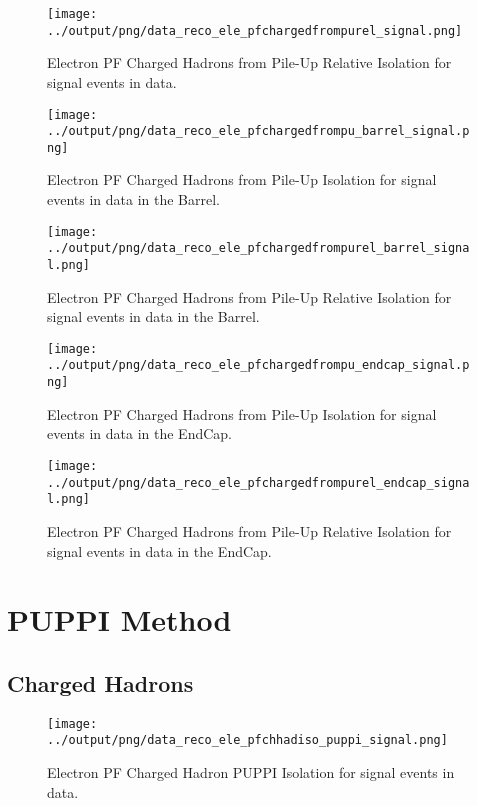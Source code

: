 \documentclass[11pt]{book}
\begin{document}
\begin{figure}[htb]
\centering
\texttt{[image: ../output/png/data\_reco\_ele\_pfchargedfrompurel\_signal.png]}
\caption{Electron PF Charged Hadrons from Pile-Up Relative Isolation for signal events in data.}
\label{fig:data_ele_pfchargedfrompurel_signal}
\end{figure}

\begin{figure}[htb]
\centering
\texttt{[image: ../output/png/data\_reco\_ele\_pfchargedfrompu\_barrel\_signal.png]}
\caption{Electron PF Charged Hadrons from Pile-Up Isolation for signal events in data in the Barrel.}
\label{fig:data_ele_pfchargedfrompu_barrel_signal}
\end{figure}

\begin{figure}[htb]
\centering
\texttt{[image: ../output/png/data\_reco\_ele\_pfchargedfrompurel\_barrel\_signal.png]}
\caption{Electron PF Charged Hadrons from Pile-Up Relative Isolation for signal events in data in the Barrel.}
\label{fig:data_ele_pfchargedfrompurel_barrel_signal}
\end{figure}

\begin{figure}[htb]
\centering
\texttt{[image: ../output/png/data\_reco\_ele\_pfchargedfrompu\_endcap\_signal.png]}
\caption{Electron PF Charged Hadrons from Pile-Up Isolation for signal events in data in the EndCap.}
\label{fig:data_ele_pfchargedfrompu_endcap_signal}
\end{figure}

\begin{figure}[htb]
\centering
\texttt{[image: ../output/png/data\_reco\_ele\_pfchargedfrompurel\_endcap\_signal.png]}
\caption{Electron PF Charged Hadrons from Pile-Up Relative Isolation for signal events in data in the EndCap.}
\label{fig:data_ele_pfchargedfrompurel_endcap_signal}
\end{figure}
\clearpage

\section{PUPPI Method}
\subsection{Charged Hadrons}
\begin{figure}[htb]
\centering
\texttt{[image: ../output/png/data\_reco\_ele\_pfchhadiso\_puppi\_signal.png]}
\caption{Electron PF Charged Hadron PUPPI Isolation for signal events in data.}
\label{fig:data_ele_pfchhadiso_puppi_signal}
\end{figure}
\end{document}
